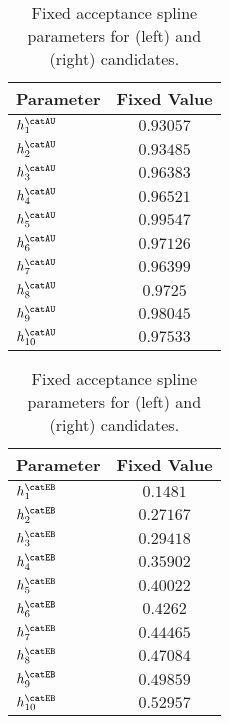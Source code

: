 \begin{table}[h]
\caption{Fixed \catAU acceptance spline parameters for (left) \catAU and (right)
\catEB candidates.}
\label{tab:app:measurement_of_sin2beta:cpv_measurement:fixed_parameters:acc}
\centering
\begin{tabular}[t]{lr@{$\,\pm\,$}l}
  \toprule
  Parameter              & \multicolumn{2}{c}{Fixed Value} \\
  \midrule
    $h_1^\text{\catAU}$  & \multicolumn{2}{c}{$0.93057$}\\
    $h_2^\text{\catAU}$  & \multicolumn{2}{c}{$0.93485$}\\
    $h_3^\text{\catAU}$  & \multicolumn{2}{c}{$0.96383$}\\
    $h_4^\text{\catAU}$  & \multicolumn{2}{c}{$0.96521$}\\
    $h_5^\text{\catAU}$  & \multicolumn{2}{c}{$0.99547$}\\
    $h_6^\text{\catAU}$  & \multicolumn{2}{c}{$0.97126$}\\
    $h_7^\text{\catAU}$  & \multicolumn{2}{c}{$0.96399$}\\
    $h_8^\text{\catAU}$  & \multicolumn{2}{c}{$0.9725$}\\
    $h_9^\text{\catAU}$  & \multicolumn{2}{c}{$0.98045$}\\
    $h_{10}^\text{\catAU}$ & \multicolumn{2}{c}{$0.97533$}\\
    \bottomrule
\end{tabular}
%
\qquad
%
\begin{tabular}[t]{lr@{$\,\pm\,$}l}
  \toprule
  Parameter               & \multicolumn{2}{c}{Fixed Value} \\
  \midrule  
    $h_1^\text{\catEB}$   & \multicolumn{2}{c}{$0.1481$}\\
    $h_2^\text{\catEB}$   & \multicolumn{2}{c}{$0.27167$}\\
    $h_3^\text{\catEB}$   & \multicolumn{2}{c}{$0.29418$}\\
    $h_4^\text{\catEB}$   & \multicolumn{2}{c}{$0.35902$}\\
    $h_5^\text{\catEB}$   & \multicolumn{2}{c}{$0.40022$}\\
    $h_6^\text{\catEB}$   & \multicolumn{2}{c}{$0.4262$}\\
    $h_7^\text{\catEB}$   & \multicolumn{2}{c}{$0.44465$}\\
    $h_8^\text{\catEB}$   & \multicolumn{2}{c}{$0.47084$}\\
    $h_9^\text{\catEB}$   & \multicolumn{2}{c}{$0.49859$}\\
    $h_{10}^\text{\catEB}$ & \multicolumn{2}{c}{$0.52957$}\\
    \bottomrule
\end{tabular}
\end{table}


